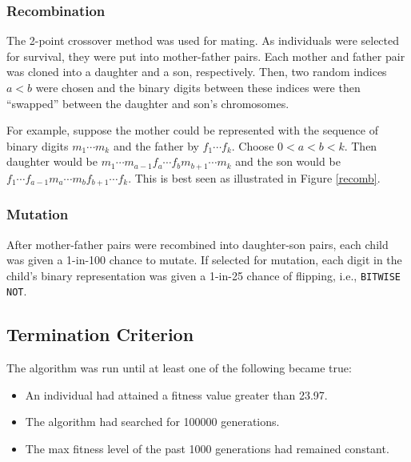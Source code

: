 \documentclass{article}
\begin{document}
    \subsubsection{Recombination}
      The 2-point crossover method was used for mating. As individuals were
      selected for survival, they were put into mother-father pairs. Each
      mother and father pair was cloned into a daughter and a son, respectively.
      Then, two random indices $a<b$ were chosen and the binary digits between
      these indices were then ``swapped'' between the daughter and son's
      chromosomes.

      For example, suppose the mother could be represented with the
      sequence of binary digits $m_1\cdots m_k$ and the father by $f_1\cdots
      f_k$. Choose $0<a<b<k$. Then daughter would be $m_1\cdots m_{a-1}f_a\cdots
      f_bm_{b+1}\cdots m_k$ and the son would be $f_1\cdots f_{a-1}m_a\cdots m_b
      f_{b+1}\cdots f_k$. This is best seen as illustrated in Figure
      \ref{recomb}.
      

    \subsubsection{Mutation}
      After mother-father pairs were recombined into daughter-son pairs, each
      child was given a 1-in-100 chance to mutate. If selected for mutation,
      each digit in the child's binary representation was given a 1-in-25
      chance of flipping, i.e., \texttt{BITWISE NOT}.

  \subsection{Termination Criterion}\label{termination-criterion}
    The algorithm was run until at least one of the following became true:
    \begin{itemize}
      \renewcommand\labelitemi{$\star$}
      \item{
        An individual had attained a fitness value greater than \num{23.97}.
      }
      \item{
        The algorithm had searched for \num{100000} generations.
      }
      \item{
        The max fitness level of the past \num{1000} generations had remained
        constant.
      }
    \end{itemize}
\end{document}
